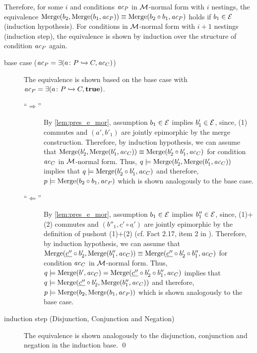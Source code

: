 Therefore, for some $i$ and conditions $\mathit{ac}_P$ in ${\cal M}$-normal form with $i$ nestings, the equivalence $\mathrm{Merge}(b_2,\mathrm{Merge}(b_1,\mathit{ac}_P))\equiv \mathrm{Merge}(b_2 \circ b_1,\mathit{ac}_P)$ holds if $b_1 \in \mathcal{E}$ (induction hypothesis).
For conditions in ${\cal M}$-normal form with $i+1$ nestings (induction step), the equivalence is shown by induction over the structure of condition $\mathit{ac}_P$ again.
\begin{description}
\item[base case ($\mathit{ac}_P=\exists(a\colon P \xhookrightarrow{} C, \mathit{ac}_C)$)]
The equivalence is shown based on the base case with $\mathit{ac}_P=\exists(a\colon P \xhookrightarrow{} C,\textbf{true})$.
\begin{description}
\item[``$\Rightarrow$'']
By \cref{lem:pres_e_mor}, assumption $b_1 \in \mathcal{E}$ implies $b'_1 \in \mathcal{E}$, since, (1) commutes and $(a',b'_1)$ are jointly epimorphic by the merge construction.
Therefore, by induction hypothesis, we can assume that $\mathrm{Merge}(b'_2,\mathrm{Merge}(b'_1,\mathit{ac}_C)) \equiv \mathrm{Merge}(b'_2 \circ b'_1,\mathit{ac}_C)$ for condition $\mathit{ac}_C$ in ${\cal M}$-normal form.
Thus, $q \models \mathrm{Merge}(b'_2, \mathrm{Merge}(b'_1,\mathit{ac}_C))$ implies that $q \models \mathrm{Merge}(b'_2 \circ b'_1,\mathit{ac}_C)$ and therefore, $p \models \mathrm{Merge}(b_2 \circ b_1,\mathit{ac}_P)$ which is shown analogously to the base case.
\item[``$\Leftarrow$'']
By \cref{lem:pres_e_mor}, assumption $b_1 \in \mathcal{E}$ implies $b''_1 \in \mathcal{E}$, since, (1)+(2) commutes and $(b''_1,\underline{c'} \circ \underline{a'})$ are jointly epimorphic by the definition of pushout (1)+(2) (cf. Fact 2.17, item 2 in \cite{Ehrig:2006:FAG:1121741}).
Therefore, by induction hypothesis, we can assume that $\mathrm{Merge}(\underline{c''} \circ b'_2,\mathrm{Merge}(b''_1,\mathit{ac}_C)) \equiv \mathrm{Merge}(\underline{c''} \circ b'_2 \circ b''_1,\mathit{ac}_C)$ for condition $\mathit{ac}_C$ in ${\cal M}$-normal form.
Thus, $q \models \mathrm{Merge}(b', \mathit{ac}_C)=\mathrm{Merge}(\underline{c''} \circ b'_2 \circ b''_1, \mathit{ac}_C)$ implies that $q \models \mathrm{Merge}(\underline{c''} \circ b'_2,\mathrm{Merge}(b''_1,\mathit{ac}_C))$ and therefore, $p \models \mathrm{Merge}(b_2, \mathrm{Merge}(b_1,\mathit{ac}_P))$ which is shown analogously to the base case.
\end{description}

\item[induction step (Disjunction, Conjunction and Negation)]
The equivalence is shown analogously to the disjunction, conjunction and negation in the induction base.
\qed
\end{description}

